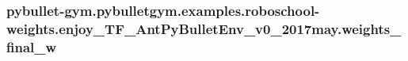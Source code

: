 \subsubsection[{\texorpdfstring{weights\+\_\+final\+\_\+w}{weights_final_w}}]{\setlength{\rightskip}{0pt plus 5cm}pybullet-\/gym.\+pybulletgym.\+examples.\+roboschool-\/weights.\+enjoy\+\_\+\+T\+F\+\_\+\+Ant\+Py\+Bullet\+Env\+\_\+v0\+\_\+2017may.\+weights\+\_\+final\+\_\+w}\hypertarget{namespacepybullet-gym_1_1pybulletgym_1_1examples_1_1roboschool-weights_1_1enjoy___t_f___ant_py_bullet_env__v0__2017may_ac73076555ecee977e1bb51374f8beaf2}{}\label{namespacepybullet-gym_1_1pybulletgym_1_1examples_1_1roboschool-weights_1_1enjoy___t_f___ant_py_bullet_env__v0__2017may_ac73076555ecee977e1bb51374f8beaf2}
